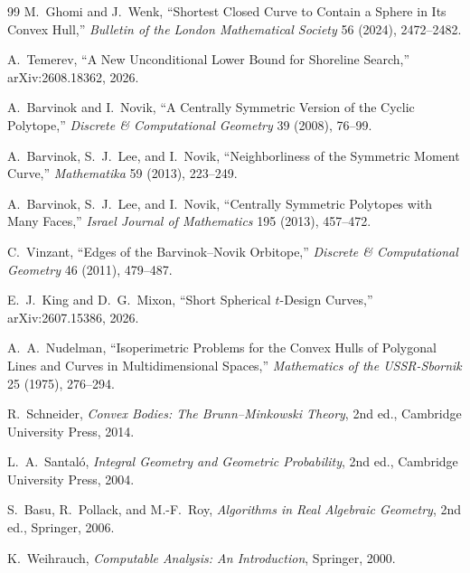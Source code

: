 \documentclass[10pt,a4paper]{article}
\theoremstyle{plain}
\theoremstyle{definition}
\theoremstyle{remark}
\begin{document}
\begin{thebibliography}{99}
M.~Ghomi and J.~Wenk,
``Shortest Closed Curve to Contain a Sphere in Its Convex Hull,''
\emph{Bulletin of the London Mathematical Society} 56 (2024), 2472--2482.

A.~Temerev,
``A New Unconditional Lower Bound for Shoreline Search,''
arXiv:2608.18362, 2026.

A.~Barvinok and I.~Novik,
``A Centrally Symmetric Version of the Cyclic Polytope,''
\emph{Discrete \& Computational Geometry} 39 (2008), 76--99.

A.~Barvinok, S.~J.~Lee, and I.~Novik,
``Neighborliness of the Symmetric Moment Curve,''
\emph{Mathematika} 59 (2013), 223--249.

A.~Barvinok, S.~J.~Lee, and I.~Novik,
``Centrally Symmetric Polytopes with Many Faces,''
\emph{Israel Journal of Mathematics} 195 (2013), 457--472.

C.~Vinzant,
``Edges of the Barvinok--Novik Orbitope,''
\emph{Discrete \& Computational Geometry} 46 (2011), 479--487.

E.~J.~King and D.~G.~Mixon,
``Short Spherical $t$-Design Curves,''
arXiv:2607.15386, 2026.

A.~A.~Nudelman,
``Isoperimetric Problems for the Convex Hulls of Polygonal Lines and Curves in Multidimensional Spaces,''
\emph{Mathematics of the USSR-Sbornik} 25 (1975), 276--294.

R.~Schneider,
\emph{Convex Bodies: The Brunn--Minkowski Theory}, 2nd ed.,
Cambridge University Press, 2014.

L.~A.~Santaló,
\emph{Integral Geometry and Geometric Probability}, 2nd ed.,
Cambridge University Press, 2004.

S.~Basu, R.~Pollack, and M.-F.~Roy,
\emph{Algorithms in Real Algebraic Geometry}, 2nd ed.,
Springer, 2006.

K.~Weihrauch,
\emph{Computable Analysis: An Introduction},
Springer, 2000.

\end{thebibliography}
\end{document}
